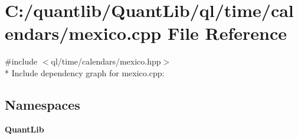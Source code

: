 \section{C\+:/quantlib/\+Quant\+Lib/ql/time/calendars/mexico.cpp File Reference}
\label{mexico_8cpp}
{\ttfamily \#include $<$ql/time/calendars/mexico.\+hpp$>$}\\*
Include dependency graph for mexico.\+cpp\+:
\subsection*{Namespaces}
\begin{DoxyCompactItemize}
\item 
 {\bf Quant\+Lib}
\end{DoxyCompactItemize}
